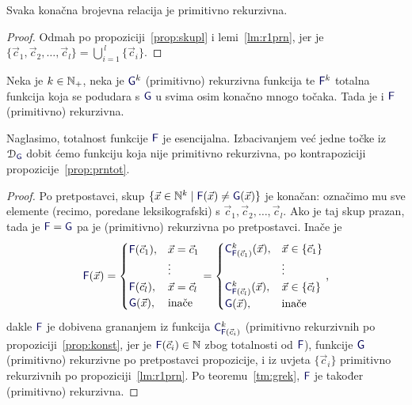 \begin{korolar}[{name=[primitivna rekurzivnost konačnih relacija]}]\label{kor:konprn}
Svaka konačna brojevna relacija je primitivno rekurzivna.
\end{korolar}
\begin{proof}
Odmah po propoziciji~\ref{prop:skupl} i lemi~\ref{lm:r1prn}, jer je $\{\vec c_1,\vec c_2,\dotsc,\vec c_l\}=\bigcup_{i=1}^{\,l}\{\vec c_i\}$.
\end{proof}

\begin{propozicija}[{name=[{teorem o editiranju za totalne funkcije}]}]\label{prop:konprom}
Neka je $k\in{\mathbb N}_+$, neka je $\f G^k$ (primitivno) rekurzivna funkcija te $\f F^k$ totalna funkcija koja se podudara s $\f G$ u svima osim konačno mnogo točaka. Tada je i $\f F$ (primitivno) rekurzivna.
\end{propozicija}
Naglasimo, totalnost funkcije $\f F$ je esencijalna. Izbacivanjem već jedne točke iz $\dom{\f G}$ dobit ćemo funkciju koja nije primitivno rekurzivna, po kontrapoziciji propozicije~\ref{prop:prntot}.
\begin{proof}
    Po pretpostavci, skup $\{\vec x\in\N^k\mid\f F(\vec x)\ne\f G(\vec x)\}$ je konačan: označimo mu sve elemente (recimo, poredane leksikografski) s $\vec c_1,\vec c_2,\dotsc,\vec c_l$. Ako je taj skup prazan, tada je $\f F=\f G$ pa je (primitivno) rekurzivna po pretpostavci. Inače je
\begin{equation}
    \f F(\vec x)=\begin{cases}
    \f F(\vec c_1),&\vec x=\vec c_1\\
    &\vdots\\
    \f F(\vec c_l),&\vec x=\vec c_l\\
    \f G(\vec x),&\text{inače}
    \end{cases}=\begin{cases}
    \f C^k_{\f F(\vec c_1)}(\vec x),&\vec x\in\{\vec c_1\}\\
    &\vdots\\
    \f C^k_{\f F(\vec c_l)}(\vec x),&\vec x\in\{\vec c_l\}\\
    \f G(\vec x),&\text{inače}
    \end{cases}\text,
\end{equation}
dakle $\f F$ je dobivena grananjem iz funkcija $\f C^k_{\f F(\vec c_i)}$ (primitivno rekurzivnih po propoziciji~\ref{prop:konst}, jer je $\f F(\vec c_i)\in\N$ zbog totalnosti od $\f F$), funkcije $\f G$ (primitivno) rekurzivne po pretpostavci propozicije, i iz uvjeta $\{\vec c_i\}$ primitivno rekurzivnih po propoziciji~\ref{lm:r1prn}. Po teoremu~\ref{tm:grek}, $\f F$ je također (primitivno) rekurzivna.
\end{proof}

